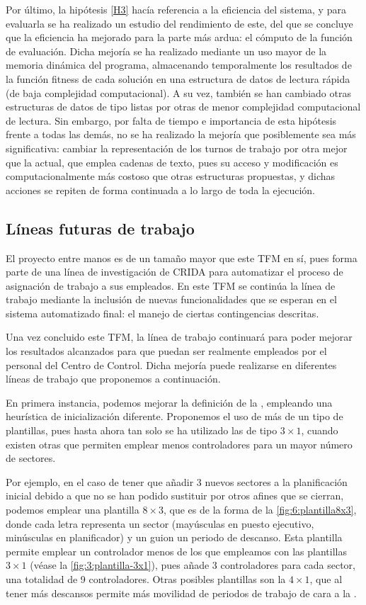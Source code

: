 Por último, la hipótesis \ref{H3} hacía referencia a la eficiencia del sistema, y para evaluarla se ha realizado un estudio del rendimiento de este, del que se concluye que la eficiencia ha mejorado para la parte más ardua: el cómputo de la función de evaluación. Dicha mejoría se ha realizado mediante un uso mayor de la memoria dinámica del programa, almacenando temporalmente los resultados de la función fitness de cada solución en una estructura de datos de lectura rápida (de baja complejidad computacional). A su vez, también se han cambiado otras estructuras de datos de tipo listas por otras de menor complejidad computacional de lectura. Sin embargo, por falta de tiempo e importancia de esta hipótesis frente a todas las demás, no se ha realizado la mejoría que posiblemente sea más significativa: cambiar la representación de los turnos de trabajo por otra mejor que la actual, que emplea cadenas de texto, pues su acceso y modificación es computacionalmente más costoso que otras estructuras propuestas, y dichas acciones se repiten de forma continuada a lo largo de toda la ejecución.

\subsection{Líneas futuras de trabajo}
\label{sec:6:trabajo-futuro}

El proyecto entre manos es de un tamaño mayor que este TFM en sí, pues forma parte de una línea de investigación de \gls{CRIDA} para automatizar el proceso de asignación de trabajo a sus empleados. En este TFM se continúa la línea de trabajo mediante la inclusión de nuevas funcionalidades que se esperan en el sistema automatizado final: el manejo de ciertas contingencias descritas.

Una vez concluido este TFM, la línea de trabajo continuará para poder mejorar los resultados alcanzados para que puedan ser realmente empleados por el personal del Centro de Control. Dicha mejoría puede realizarse en diferentes líneas de trabajo que proponemos a continuación.

En primera instancia, podemos mejorar la definición de la \faseuno{}, empleando una heurística de inicialización diferente. Proponemos el uso de más de un tipo de plantillas, pues hasta ahora tan solo se ha utilizado las de tipo $3\times1$, cuando existen otras que permiten emplear menos controladores para un mayor número de sectores. 

Por ejemplo, en el caso de tener que añadir 3 nuevos sectores a la planificación inicial debido a que no se han podido sustituir por otros afines que se cierran, podemos emplear una plantilla $8\times3$, que es de la forma de la \autoref{fig:6:plantilla8x3}, donde cada letra representa un sector (mayúsculas en puesto ejecutivo, minúsculas en planificador) y un guion un periodo de descanso. Esta plantilla permite emplear un controlador menos de los que empleamos con las plantillas $3\times1$ (véase la \autoref{fig:3:plantilla-3x1}), pues añade 3 controladores para cada sector, una totalidad de 9 controladores. Otras posibles plantillas son la $4\times1$, que al tener más descansos permite más movilidad de periodos de trabajo de cara a la \fasedos{}. %

